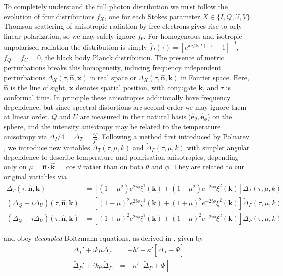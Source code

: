 \documentclass[a4paper,10pt]{article}
\renewcommand{\v}[1]{\mathbf{#1}}
\newcommand{\unit}[1]{\hat{\v{#1}}}
\begin{document}
To completely understand the full photon distribution we must follow the evolution of four distributions $f_X$, one for each Stokes parameter $X\in\{I,Q,U,V\}$. Thomson scattering of anisotropic radiation by free electrons gives rise to only linear polarization, so we may safely ignore $f_V$. For homogeneous and isotropic unpolarised radiation the distribution is simply $\bar{f}_I(\tau)= [e^{\hbar \nu/k_b T(\tau)}-1]^{-1}$, $f_Q=f_U=0$, the black body Planck distribution. The presence of metric perturbations breaks this homogeneity, inducing frequency independent perturbations $\Delta_X(\tau,\unit{n},\v{x})$ in real space or $\Delta_X(\tau,\unit{n},\v{k})$ in Fourier space.  Here, $\unit{n}$ is the line of sight, $\v{x}$ denotes spatial position, with conjugate $\v{k}$, and $\tau$ is conformal time. In principle these anisotropies additionally have frequency dependence, but since spectral distortions are second order we may ignore them at linear order. $Q$ and $U$ are measured in their natural basis ($\unit{e}_\theta, \unit{e}_\phi$) on the sphere, and the intensity anisotropy may be related to the temperature anisotropy via $\Delta_I/4=\Delta_T=\frac{\delta T}{\bar{T}}$. Following a method first introduced by Polnarev \cite{polnarev}, we introduce new variables $\tilde{\Delta}_T(\tau,\mu,k)$ and $\tilde{\Delta}_P(\tau,\mu,k)$ with simpler angular dependence to describe temperature and polarisation anisotropies, depending only on $\mu=\unit{n}\cdot\unit{k}=\cos\theta$ rather than on both $\theta$ and $\phi$. They are related to our original variables via
\begin{equation}\begin{split}
\Delta_T(\tau,\unit{n},\v{k}) &= [(1-\mu^2) e^{2i\phi} \xi^1(\v{k})+(1-\mu^2) e^{-2i\phi} \xi^2(\v{k})]\tilde{\Delta}_T(\tau,\mu,k)\\
(\Delta_Q+i\Delta_U)(\tau,\unit{n},\v{k}) &=[(1-\mu)^2 e^{2i\phi} \xi^1(\v{k})+(1+\mu)^2 e^{-2i\phi} \xi^2(\v{k})]\tilde{\Delta}_P(\tau,\mu,k) \\
(\Delta_Q-i\Delta_U)(\tau,\unit{n},\v{k}) &=[(1+\mu)^2 e^{2i\phi} \xi^1(\v{k})+(1-\mu)^2 e^{-2i\phi} \xi^2(\v{k})]\tilde{\Delta}_P(\tau,\mu,k)
\end{split}\end{equation}

and obey \textit{decoupled} Boltzmann equations, as derived in \cite{kowosky}, given by
\begin{equation}\begin{split}
\tilde{\Delta}_T'+ik\mu \tilde{\Delta}_T &= -h' -\kappa'[\tilde{\Delta}_T - \Psi]\\
\tilde{\Delta}_P'+ik\mu\tilde{\Delta}_P &= -\kappa'[\tilde{\Delta}_P + \Psi]
\end{split}
\label{Boltzmann}\end{equation}
\end{document}
